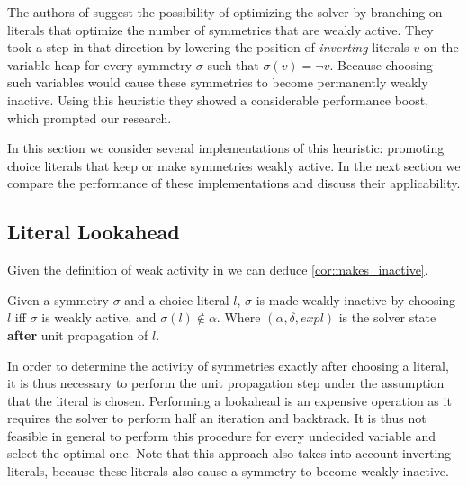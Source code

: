 
The authors of \cite{katebi2010symmetry} suggest the possibility of optimizing the solver by
branching on literals that optimize the number of symmetries that are weakly active.
They took a step in that direction by lowering the position of \emph{inverting} literals $v$ on the variable heap for
every symmetry $\sigma$ such that $\sigma(v) = \neg v$.
Because choosing such variables would cause these symmetries to become permanently weakly inactive.
Using this heuristic they showed a considerable performance boost, which prompted our research.

In this section we consider several implementations of this heuristic: promoting choice literals
that keep or make symmetries weakly active.
In the next section we compare the performance of these implementations and discuss their
applicability.

\subsection{Literal Lookahead}
	Given the definition of weak activity in \cite{devriendt2012symmetry} we can deduce \cref{cor:makes_inactive}.\\

	\begin{corollary}
		\label{cor:makes_inactive}
		Given a symmetry $\sigma$ and a choice literal $l$,
		$\sigma$ is made weakly inactive by choosing $l$ iff
		$\sigma$ is weakly active, and $\sigma(l) \notin \alpha$.
		Where $(\alpha,\delta,\textit{expl})$ is the solver state \textbf{after} unit propagation of $l$. 
	\end{corollary}

	In order to determine the activity of symmetries exactly after choosing a literal, it is thus
	necessary to perform the unit propagation step under the assumption that the literal is chosen.
	Performing a lookahead is an expensive operation as it requires the solver to perform half an
	iteration and backtrack.
	It is thus not feasible in general to perform this procedure for every undecided variable and
	select the optimal one.	
	Note that this approach also takes into account inverting literals,
	because these literals also cause a symmetry to become weakly inactive.
	
